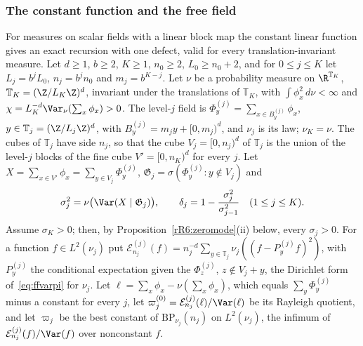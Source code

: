 \subsubsection{The constant function and the free field}

For measures on scalar fields with a linear block map the constant linear
function gives an exact recursion with one defect, valid for every
translation-invariant measure. Let $d\ge1$, $b\ge2$, $K\ge1$, $n_0\ge2$,
$L_0\ge n_0+2$, and for $0\le j\le K$ let $L_j=b^jL_0$, $n_j=b^jn_0$ and
$m_j=b^{K-j}$. Let $\nu$ be a probability measure on $\R^{\mathbb T_K}$,
$\mathbb T_K=(\Z/L_K\Z)^d$, invariant under the translations of $\mathbb
T_K$, with $\int\phi_x^2\,d\nu<\infty$ and $\chi=L_K^{-d}\Var_\nu(\sum_x
\phi_x)>0$. The level-$j$ field is $\Phi^{(j)}_y=\sum_{x\in B^{(j)}_y}\phi_x$,
$y\in\mathbb T_j=(\Z/L_j\Z)^d$, with $B^{(j)}_y=m_jy+[0,m_j)^d$, and $\nu_j$
is its law; $\nu_K=\nu$. The cubes of $\mathbb T_j$ have side $n_j$, so that
the cube $V_j=[0,n_j)^d$ of $\mathbb T_j$ is the union of the level-$j$
blocks of the fine cube $V'=[0,n_K)^d$ for every $j$. Let $X=\sum_{x\in V'}
\phi_x=\sum_{y\in V_j}\Phi^{(j)}_y$, $\mathfrak G_j=\sigma(\Phi^{(j)}_y:y
\notin V_j)$ and
\[
\sigma_j^2=\nu\bigl(\Var(X\mid\mathfrak G_j)\bigr),\qquad\delta_j=1-
\frac{\sigma_j^2}{\sigma_{j-1}^2}\quad(1\le j\le K).
\]
Assume $\sigma_K>0$; then, by Proposition~\ref{rR6:zeromode}(ii) below,
every $\sigma_j>0$. For a function $f\in L^2(\nu_j)$ put $\mathcal E^{(j)}
_{n_j}(f)=n_j^{-d}\sum_{y\in\mathbb T_j}\nu_j((f-P^{(j)}_yf)^2)$, with
$P^{(j)}_y$ the conditional expectation given the $\Phi^{(j)}_z$, $z\notin
V_j+y$, the Dirichlet form of~\eqref{eq:ffvarpi} for $\nu_j$. Let $\ell=
\sum_x\phi_x-\nu(\sum_x\phi_x)$, which equals $\sum_y\Phi^{(j)}_y$
minus a constant for every $j$, let $\varpi^{(0)}_j=\mathcal E^{(j)}_{n_j}
(\ell)/\Var(\ell)$ be its Rayleigh quotient, and let $\varpi_j$ be the
best constant of $\mathrm{BP}_{\nu_j}(n_j)$ on $L^2(\nu_j)$, the infimum
of $\mathcal E^{(j)}_{n_j}(f)/\Var(f)$ over nonconstant $f$.
